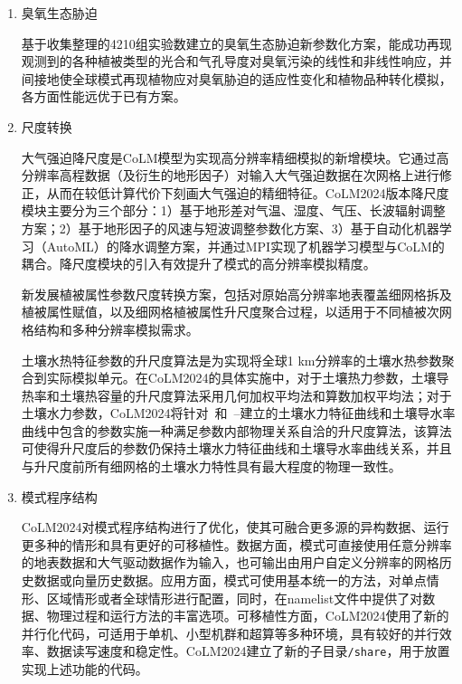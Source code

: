\begin{enumerate}[label={\arabic*)}]
\item 臭氧生态胁迫

  基于收集整理的4210组实验数建立的臭氧生态胁迫新参数化方案，能成功再现观测到的各种植被类型的光合和气孔导度对臭氧污染的线性和非线性响应，并间接地使全球模式再现植物应对臭氧胁迫的适应性变化和植物品种转化模拟，各方面性能远优于已有方案。

\item 尺度转换

  大气强迫降尺度是CoLM模型为实现高分辨率精细模拟的新增模块。它通过高分辨率高程数据（及衍生的地形因子）对输入大气强迫数据在次网格上进行修正，从而在较低计算代价下刻画大气强迫的精细特征。CoLM2024版本降尺度模块主要分为三个部分：1）基于地形差对气温、湿度、气压、长波辐射调整方案；2）基于地形因子的风速与短波调整参数化方案、3）基于自动化机器学习（AutoML）的降水调整方案，并通过MPI实现了机器学习模型与CoLM的耦合。降尺度模块的引入有效提升了模式的高分辨率模拟精度。

  新发展植被属性参数尺度转换方案，包括对原始高分辨率地表覆盖细网格拆及植被属性赋值，以及细网格植被属性升尺度聚合过程，以适用于不同植被次网格结构和多种分辨率模拟需求。

  土壤水热特征参数的升尺度算法是为实现将全球1 km分辨率的土壤水热参数聚合到实际模拟单元。在CoLM2024的具体实施中，对于土壤热力参数，土壤导热率和土壤热容量的升尺度算法采用几何加权平均法和算数加权平均法；对于土壤水力参数，CoLM2024将针对~\citet{campbell1974}和~\citet{van1980closed}–\citet{mualem1976new}建立的土壤水力特征曲线和土壤导水率曲线中包含的参数实施一种满足参数内部物理关系自洽的升尺度算法，该算法可使得升尺度后的参数仍保持土壤水力特征曲线和土壤导水率曲线关系，并且与升尺度前所有细网格的土壤水力特性具有最大程度的物理一致性。

\item 模式程序结构

  CoLM2024对模式程序结构进行了优化，使其可融合更多源的异构数据、运行更多种的情形和具有更好的可移植性。数据方面，模式可直接使用任意分辨率的地表数据和大气驱动数据作为输入，也可输出由用户自定义分辨率的网格历史数据或向量历史数据。应用方面，模式可使用基本统一的方法，对单点情形、区域情形或者全球情形进行配置，同时，在namelist文件中提供了对数据、物理过程和运行方法的丰富选项。可移植性方面，CoLM2024使用了新的并行化代码，可适用于单机、小型机群和超算等多种环境，具有较好的并行效率、数据读写速度和稳定性。CoLM2024建立了新的子目录\texttt{/share}，用于放置实现上述功能的代码。

\end{enumerate}

